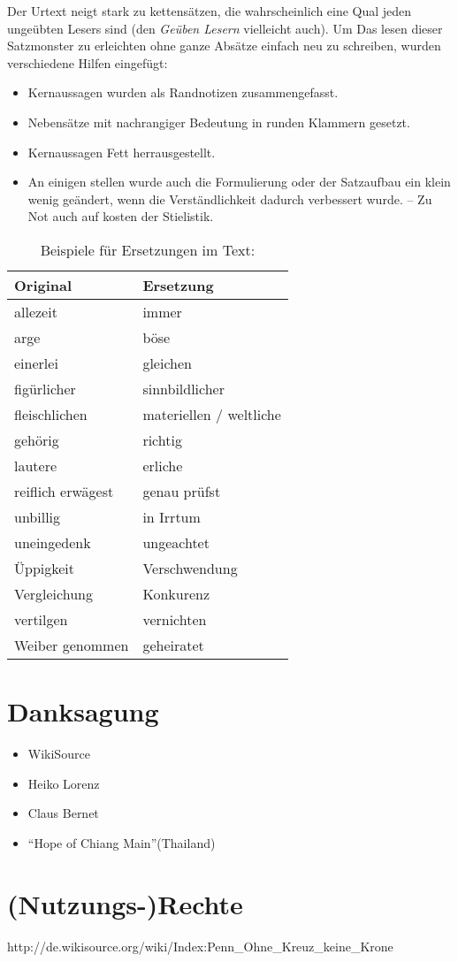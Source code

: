 \medskip

Der Urtext neigt stark zu kettensätzen, die wahrscheinlich eine Qual jeden
ungeübten Lesers sind (den \textit{Geüben Lesern} vielleicht auch). Um
Das lesen dieser Satzmonster zu erleichten ohne ganze Absätze einfach neu
zu schreiben, wurden verschiedene Hilfen eingefügt:

\begin{itemize}
 \item Kernaussagen wurden als Randnotizen zusammengefasst.
 \item Nebensätze mit nachrangiger Bedeutung in runden Klammern gesetzt.
 \item Kernaussagen Fett herrausgestellt.
 \item An einigen stellen wurde auch die Formulierung oder der Satzaufbau
 ein klein wenig geändert, wenn die Verständlichkeit dadurch verbessert wurde.
 -- Zu Not auch auf kosten der Stielistik.
\end{itemize}

\begin{table} \centering
\caption{Beispiele für Ersetzungen im Text:}
\begin{tabular}{|l|l|} \hline
\textbf{Original} 	& \textbf{Ersetzung} 		\\ \hline \hline
allezeit 		& immer  			\\ \hline
arge 			& böse  			\\ \hline
einerlei 		& gleichen 	 		\\ \hline
figürlicher 		& sinnbildlicher  		\\ \hline
fleischlichen  		& materiellen / weltliche  	\\ \hline
gehörig 		& richtig			\\ \hline
lautere 		& erliche   			\\ \hline
reiflich erwägest 	& genau prüfst 			\\ \hline
unbillig       		& in Irrtum  			\\ \hline
uneingedenk 		& ungeachtet			\\ \hline
Üppigkeit 		& Verschwendung 		\\ \hline
Vergleichung 		& Konkurenz  			\\ \hline
vertilgen 		& vernichten			\\ \hline
Weiber genommen 	& geheiratet  			\\ \hline
 
\end{tabular} 

\end{table}

\chapter{Danksagung}

\begin{itemize}
 \item WikiSource
 \item Heiko Lorenz
 \item Claus Bernet
 \item "`Hope of Chiang Main"'(Thailand)
\end{itemize}


\chapter{(Nutzungs-)Rechte}
http://de.wikisource.org/wiki/Index:Penn\_Ohne\_Kreuz\_keine\_Krone

